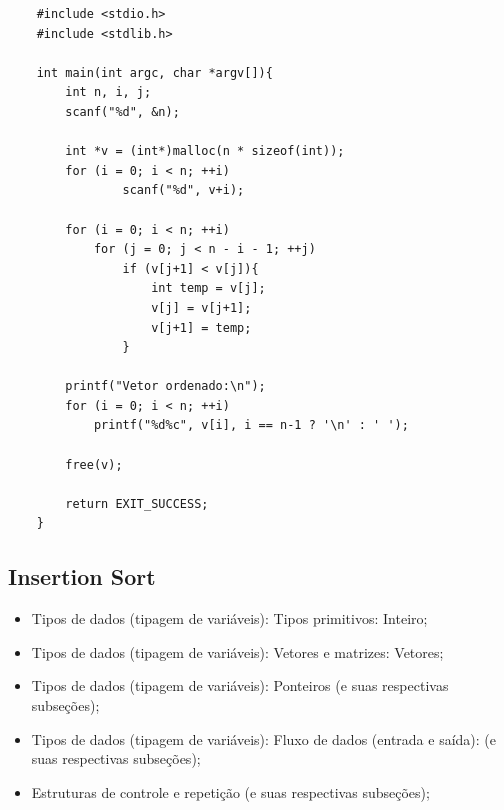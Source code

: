 \documentclass[12pt]{article}
\begin{document}
\hspace{0.25cm}
\begin{lstlisting}
    #include <stdio.h>
    #include <stdlib.h>
        
    int main(int argc, char *argv[]){
        int n, i, j;
        scanf("%d", &n);
            
        int *v = (int*)malloc(n * sizeof(int));
        for (i = 0; i < n; ++i)
                scanf("%d", v+i);
    
        for (i = 0; i < n; ++i)
    		for (j = 0; j < n - i - 1; ++j)
                if (v[j+1] < v[j]){
                    int temp = v[j];
                    v[j] = v[j+1];
                    v[j+1] = temp;
                }
        
        printf("Vetor ordenado:\n");
        for (i = 0; i < n; ++i)
            printf("%d%c", v[i], i == n-1 ? '\n' : ' ');
            
        free(v);
        
        return EXIT_SUCCESS;
    }
\end{lstlisting}

\newpage
\subsection{Insertion Sort}

\hspace{0.25cm}
\begin{tcolorbox}[colback=violet!5!white,colframe=violet!75!white,title=Capítulos recomendados:]
    \begin{itemize}
        \item Tipos de dados (tipagem de variáveis): Tipos primitivos: Inteiro;
        \item Tipos de dados (tipagem de variáveis): Vetores e matrizes: Vetores;
        \item Tipos de dados (tipagem de variáveis): Ponteiros (e suas respectivas subseções);
        \item Tipos de dados (tipagem de variáveis): Fluxo de dados (entrada e saída): (e suas respectivas subseções);
        \item Estruturas de controle e repetição (e suas respectivas subseções);
    \end{itemize}
\end{tcolorbox}
\end{document}
